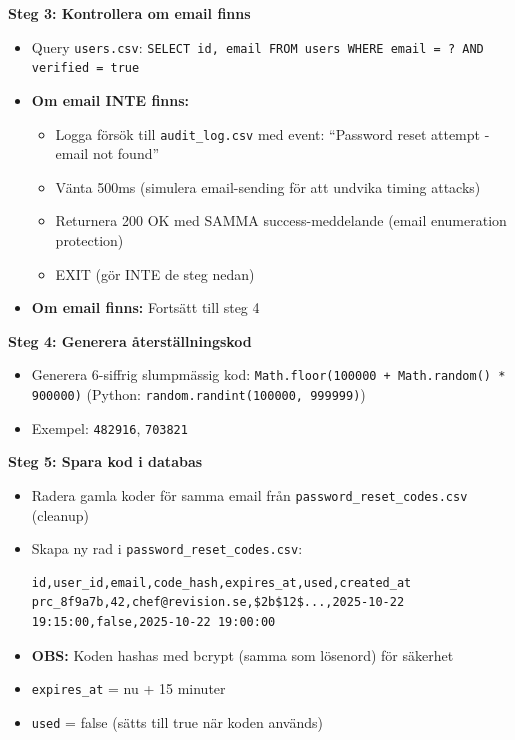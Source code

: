 \documentclass[12pt,a4paper]{article}
\begin{document}
\textbf{Steg 3: Kontrollera om email finns}
\begin{itemize}[noitemsep]
  \item Query \texttt{users.csv}: \texttt{SELECT id, email FROM users WHERE email = ? AND verified = true}
  \item \textbf{Om email INTE finns:}
  \begin{itemize}[noitemsep]
    \item Logga försök till \texttt{audit\_log.csv} med event: ``Password reset attempt - email not found''
    \item Vänta 500ms (simulera email-sending för att undvika timing attacks)
    \item Returnera 200 OK med SAMMA success-meddelande (email enumeration protection)
    \item EXIT (gör INTE de steg nedan)
  \end{itemize}
  \item \textbf{Om email finns:} Fortsätt till steg 4
\end{itemize}

\textbf{Steg 4: Generera återställningskod}
\begin{itemize}[noitemsep]
  \item Generera 6-siffrig slumpmässig kod: \texttt{Math.floor(100000 + Math.random() * 900000)} (Python: \texttt{random.randint(100000, 999999)})
  \item Exempel: \texttt{482916}, \texttt{703821}
\end{itemize}

\textbf{Steg 5: Spara kod i databas}
\begin{itemize}[noitemsep]
  \item Radera gamla koder för samma email från \texttt{password\_reset\_codes.csv} (cleanup)
  \item Skapa ny rad i \texttt{password\_reset\_codes.csv}:
  \begin{verbatim}
id,user_id,email,code_hash,expires_at,used,created_at
prc_8f9a7b,42,chef@revision.se,$2b$12$...,2025-10-22 19:15:00,false,2025-10-22 19:00:00
  \end{verbatim}
  \item \textbf{OBS:} Koden hashas med bcrypt (samma som lösenord) för säkerhet
  \item \texttt{expires\_at} = nu + 15 minuter
  \item \texttt{used} = false (sätts till true när koden används)
\end{itemize}
\end{document}

